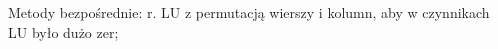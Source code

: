 
\entry
Metody bezpośrednie:
r. LU z permutacją wierszy i kolumn, aby w czynnikach LU było dużo zer;



